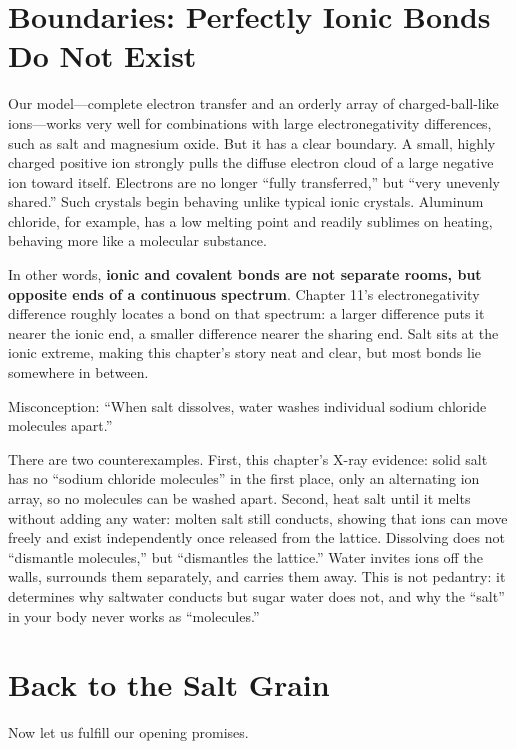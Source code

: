 \section{Boundaries: Perfectly Ionic Bonds Do Not Exist}

Our model---complete electron transfer and an orderly array of charged-ball-like ions---works very well for combinations with large electronegativity differences, such as salt and magnesium oxide. But it has a clear boundary. A small, highly charged positive ion strongly pulls the diffuse electron cloud of a large negative ion toward itself. Electrons are no longer ``fully transferred,'' but ``very unevenly shared.'' Such crystals begin behaving unlike typical ionic crystals. Aluminum chloride, for example, has a low melting point and readily sublimes on heating, behaving more like a molecular substance.

In other words, \textbf{ionic and covalent bonds are not separate rooms, but opposite ends of a continuous spectrum}. Chapter 11's electronegativity difference roughly locates a bond on that spectrum: a larger difference puts it nearer the ionic end, a smaller difference nearer the sharing end. Salt sits at the ionic extreme, making this chapter's story neat and clear, but most bonds lie somewhere in between.

\begin{wuqu}
Misconception: ``When salt dissolves, water washes individual sodium chloride molecules apart.''

There are two counterexamples. First, this chapter's X-ray evidence: solid salt has no ``sodium chloride molecules'' in the first place, only an alternating ion array, so no molecules can be washed apart. Second, heat salt until it melts without adding any water: molten salt still conducts, showing that ions can move freely and exist independently once released from the lattice. Dissolving does not ``dismantle molecules,'' but ``dismantles the lattice.'' Water invites ions off the walls, surrounds them separately, and carries them away. This is not pedantry: it determines why saltwater conducts but sugar water does not, and why the ``salt'' in your body never works as ``molecules.''
\end{wuqu}

\section{Back to the Salt Grain}

Now let us fulfill our opening promises.

